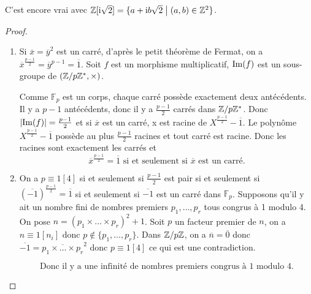 \documentclass[12pt]{article}
\begin{document}
\begin{remark}
	C'est encore vrai avec $\mathbb{Z}[\mathrm{i}\sqrt{2}]=\{a+\mathrm{i} b\sqrt{2}\bigm|(a,b)\in\mathbb{Z}^{2}\}$.
\end{remark}

\begin{proof}
	\phantom{}
	\begin{enumerate}
		\item Si $\overline{x}=\overline{y}^{2}$ est un carré, d'après le petit théorème de Fermat, on a $\overline{x}^{\frac{p-1}{2}}=\overline{y}^{p-1}=\overline{1}$. Soit 
		$f$ est un morphisme multiplicatif, $\mathrm{Im}(f)$ est un sous-groupe de $\left(\mathbb{Z}/p\mathbb{Z}^{*},\times\right)$.

		Comme $\mathbb{F}_{p}$ est un corps, chaque carré possède exactement deux antécédents. Il y a $p-1$ antécédents, donc il y a $\frac{p-1}{2}$ carrés dans $\mathbb{Z}/p\mathbb{Z}^{*}$. Donc $\vert\mathrm{Im}(f)\vert=\frac{p-1}{2}$ et si $\overline{x}$ est un carré, x est racine de $X^{\frac{p-1}{2}}-\overline{1}$. Le polynôme $X^{\frac{p-1}{2}}-\overline{1}$ possède au plus $\frac{p-1}{2}$ racines et tout carré est racine. Donc les racines sont exactement les carrés et 
		\begin{equation}
			\boxed{\overline{x}^{\frac{p-1}{2}}=\overline{1}\text{ si et seulement si }\overline{x}\text{ est un carré.}}
		\end{equation}

		\item On a $p\equiv1[4]$ si et seulement si $\frac{p-1}{2}$ est pair si  et seulement si $(\overline{-1})^{\frac{p-1}{2}}=\overline{1}$ si et seulement si $\overline{-1}$ est un carré dans $\mathbb{F}_{p}$.
		Supposons qu'il y ait un nombre fini de nombres premiers $p_{1},\dots,p_{r}$ tous congrus à 1 modulo 4. 
		On pose $n=(p_{1}\times\dots\times p_{r})^{2}+1$.
		Soit $p$ un facteur premier de $n$, on a $n\equiv 1[n_{i}]$ donc $p\notin\{p_{1},\dots,p_{r}\}$.
		Dans $\mathbb{Z}/p\mathbb{Z}$, on a $\overline{n}=\overline{0}$ donc $\overline{-1}=\overline{p_{1}\times\dots\times p_{r}}^{2}$ donc $p\equiv1[4]$ ce qui est une contradiction.

		\begin{equation}
			\boxed{\text{Donc il y a une infinité de nombres premiers congrus à 1 modulo 4.}}
		\end{equation}
	\end{enumerate}
\end{proof}
\end{document}
